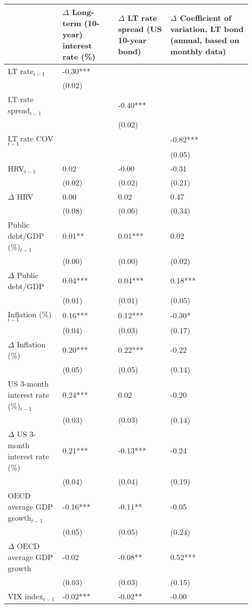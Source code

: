 {\tiny
\begin{tabular}{lp{2cm}p{2cm}p{2cm}}
  \hline
 & $\Delta$ Long-term (10-year) interest rate (\%) & $\Delta$ LT rate spread (US 10-year bond) & $\Delta$ Coefficient of variation, LT bond (annual, based on monthly data) \\ 
  \hline
LT rate$_{t-1}$ & -0.30*** &  &  \\ 
   & (0.02) &  &  \\ 
  LT rate spread$_{t-1}$ &  & -0.40*** &  \\ 
   &  & (0.02) &  \\ 
  LT rate COV$_{t-1}$ &  &  & -0.82*** \\ 
   &  &  & (0.05) \\ 
  HRV$_{t-1}$ & 0.02 & -0.00 & -0.31 \\ 
   & (0.02) & (0.02) & (0.21) \\ 
  $\Delta$ HRV & 0.00 & 0.02 & 0.47 \\ 
   & (0.08) & (0.06) & (0.34) \\ 
  Public debt/GDP (\%)$_{t-1}$ & 0.01** & 0.01*** & 0.02 \\ 
   & (0.00) & (0.00) & (0.02) \\ 
  $\Delta$ Public debt/GDP & 0.04*** & 0.04*** & 0.18*** \\ 
   & (0.01) & (0.01) & (0.05) \\ 
  Inflation (\%) $_{t-1}$ & 0.16*** & 0.12*** & -0.30* \\ 
   & (0.04) & (0.03) & (0.17) \\ 
  $\Delta$ Inflation (\%) & 0.20*** & 0.22*** & -0.22 \\ 
   & (0.05) & (0.05) & (0.14) \\ 
  US 3-month interest rate (\%)$_{t-1}$ & 0.24*** & 0.02 & -0.20 \\ 
   & (0.03) & (0.03) & (0.14) \\ 
  $\Delta$ US 3-month interest rate (\%) & 0.21*** & -0.13*** & -0.24 \\ 
   & (0.04) & (0.04) & (0.19) \\ 
  OECD average GDP growth$_{t-1}$ & -0.16*** & -0.11** & -0.05 \\ 
   & (0.05) & (0.05) & (0.24) \\ 
  $\Delta$ OECD average GDP growth & -0.02 & -0.08** & 0.52*** \\ 
   & (0.03) & (0.03) & (0.15) \\ 
  VIX index$_{t-1}$ & -0.02*** & -0.02** & -0.00 \\ 

\end{tabular}}
